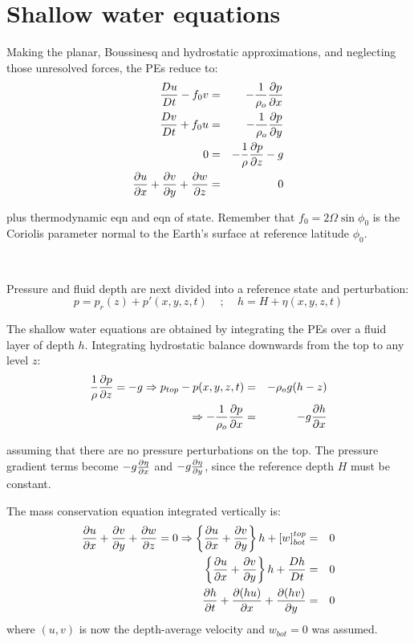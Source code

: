 \section{Shallow water equations}

Making the planar, Boussinesq and hydrostatic approximations, and neglecting those unresolved forces, 
the PEs reduce to:
\begin{eqnarray}
	\frac{D u}{D t}-f_0 v & = & -\frac{1}{\rho_o}\frac{\partial p}{\partial x} \\
	\frac{D v}{D t}+f_0 u & = & -\frac{1}{\rho_o}\frac{\partial p}{\partial y} \\
	0 & = & - \frac{1}{\rho} \frac{\partial p}{\partial z} - g \\
	\frac{\partial u}{\partial x}+\frac{\partial v}{\partial y}+\frac{\partial w}{\partial z} & = & 0
\end{eqnarray}

plus thermodynamic eqn and eqn of state. Remember that $f_0=2\Omega \sin\phi_0$ is the Coriolis parameter normal to the Earth's surface at
reference latitude $\phi_0$.

~

Pressure and fluid depth are next divided into
a reference state and perturbation:
\begin{equation*}
	p=p_r(z)+p'(x,y,z,t)~~~~~;~~~~~h=H+\eta(x,y,z,t)
\end{equation*}

The shallow water equations are obtained by integrating the PEs
over a fluid layer of depth $h$. Integrating hydrostatic balance
downwards from the top to any level $z$:
\begin{eqnarray*}
	\frac{1}{\rho}\frac{\partial p}{\partial z}=-g \Rightarrow p_{top}-p(x,y,z,t) & = & -\rho_o g (h-z) \\
	\Rightarrow -\frac{1}{\rho_o} \frac{\partial p}{\partial x} & = & -g \frac{\partial h}{\partial x}
\end{eqnarray*}

assuming that there are no pressure perturbations on the top.
The pressure gradient terms become $-g\frac{\partial \eta}{\partial x}$ and
$-g\frac{\partial \eta}{\partial y}$, since the reference depth $H$ must be constant.

The mass conservation equation integrated vertically is:
\begin{eqnarray*}
	\frac{\partial u}{\partial x}+\frac{\partial v}{\partial y}+\frac{\partial w}{\partial z} = 0 \Rightarrow \left\{ \frac{\partial u}{\partial x}+\frac{\partial v}{\partial y} \right\} h+[w]^{top}_{bot} & = & 0 \\
	\left\{ \frac{\partial u}{\partial x}+\frac{\partial v}{\partial y} \right\} h+\frac{D h}{D t} & = & 0 \\
	\frac{\partial h}{\partial t}+\frac{\partial (hu)}{\partial x}+\frac{\partial (hv)}{\partial y} & = & 0
\end{eqnarray*}
where $(u,v)$ is now the depth-average velocity and $w_{bot}=0$ was assumed. 


